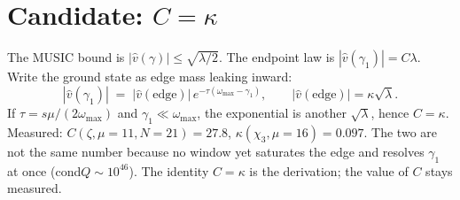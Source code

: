 \documentclass[10pt]{article}
\begin{document}
\section*{Candidate: $C=\kappa$}
The MUSIC bound is $|\hat v(\gamma)|\le\sqrt{\lambda/2}$. The endpoint
law is $|\hat v(\gamma_1)|=C\lambda$. Write the ground state as edge
mass leaking inward:
\[
|\hat v(\gamma_1)|
\;=\;
|\hat v(\mathrm{edge})|\,e^{-\tau(\omega_{\max}-\gamma_1)},
\qquad
|\hat v(\mathrm{edge})|=\kappa\sqrt{\lambda}.
\]
If $\tau=s\mu/(2\omega_{\max})$ and $\gamma_1\ll\omega_{\max}$, the
exponential is another $\sqrt{\lambda}$, hence $C=\kappa$.
Measured: $C(\zeta,\mu=11,N=21)=27.8$, $\kappa(\chi_3,\mu=16)=0.097$.
The two are not the same number because no window yet saturates the
edge and resolves $\gamma_1$ at once (cond$Q\sim10^{46}$). The
identity $C=\kappa$ is the derivation; the value of $C$ stays
measured.
\end{document}
